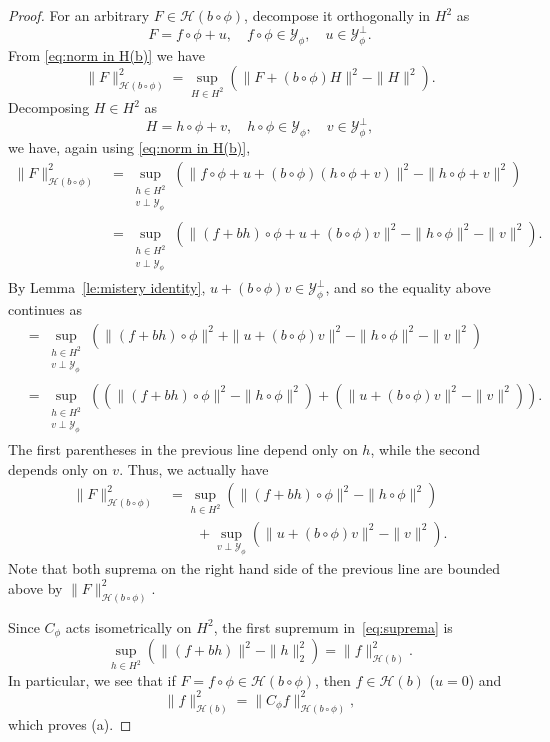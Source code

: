 \documentclass[11pt]{amsart}
\def\HH{{\mathcal H}}
\def\YY{{\mathcal Y}}
\numberwithin{equation}{section}
\theoremstyle{plain}
\theoremstyle{definition}
\begin{document}
\begin{proof}
For an arbitrary $F\in \HH(b\circ\phi)$, decompose it orthogonally in $H^2$ as 
$$F=f\circ \phi+u, \quad f\circ \phi\in \YY_\phi, \quad u\in\YY_\phi^\perp.$$ From \eqref{eq:norm in H(b)} we have
	\[
		\|F\|^2_{\mathcal{H}(b \circ \phi)}=\sup_{H\in H^2}\left( \|F+(b\circ \phi) H\|^2-\|H\|^2\right).
	\]
	Decomposing $H \in H^2$ as 
    $$H=h\circ \phi+v, \quad h\circ \phi\in \YY_\phi, \quad v\in\YY_\phi^\perp,$$ we have, again using \eqref{eq:norm in H(b)},
	\[
	\begin{split}
		\|F\|^2_{\mathcal{H}(b \circ \phi)}&= \sup_{\substack{h \in H^2 \\ v \perp \YY_{\phi}}} \left(\| f\circ\phi+u+(b\circ\phi)(h\circ \phi+v)\|^2-\|h\circ\phi+v\|^2\right)\\
		&=\sup_{\substack{h \in H^2 \\ v \perp \YY_{\phi}}} \left(\| (f+bh)\circ\phi+u+(b\circ\phi)v\|^2-\|h\circ\phi\|^2-\|v\|^2\right).
	\end{split}
	\]
	By Lemma~\ref{le:mistery identity}, $u+(b\circ \phi)v\in \YY_\phi^\perp$, and so the equality above continues as 
\begin{align*}
& = \sup_{\substack{h \in H^2 \\ v \perp \YY_{\phi}}} \left(\| (f+bh)\circ\phi\|^2+\|u+(b\circ\phi)v\|^2-\|h\circ\phi\|^2-\|v\|^2\right)\\
	&=\sup_{\substack{h \in H^2 \\ v \perp \YY_{\phi}}} \left(\left(\| (f+bh)\circ\phi\|^2-\|h\circ\phi\|^2\right) + \left(\| u+(b\circ \phi)v\|^2-\|v\|^2\right)\right).
\end{align*}
	The first parentheses in the previous line depend only on $ h $, while the second depends only on $ v $. Thus,  we actually have
		\begin{align}\label{eq:suprema}
			\|F\|^2_{\mathcal{H}(b \circ \phi)} & =
		\sup_{h\in H^2} \left(\| (f+bh)\circ\phi\|^2-\|h\circ\phi\|^2\right)\\
		& \quad \quad  +\sup_{v\perp\YY_\phi} \left(\| u+(b\circ \phi)v\|^2-\|v\|^2\right).\nonumber
		\end{align}
Note that both suprema on the right hand side of the previous line are bounded above by $\|F\|^2_{\mathcal{H}(b \circ \phi)}$.


	Since $C_\phi$ acts isometrically on $H^2$, the first supremum in~\eqref{eq:suprema} is
	\begin{equation}\label{eq:first supremum}
			\sup_{h\in H^2} \left(\| (f+bh) \|^2-\|h \|^2_2\right)=\|f\|^2_{\HH(b)}.
	\end{equation}
	In particular, we see that if  $F =   f\circ\phi \in \HH(b\circ\phi) $, then $f \in \HH(b)$ ($u = 0$) and
	\[
	\|f\|^2_{\HH(b)}=\|C_\phi f\|^2_{\HH(b\circ\phi)},
	\]
	which proves (a).
	

\end{proof}
\end{document}
